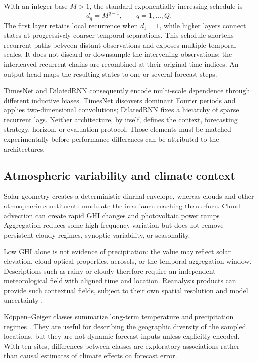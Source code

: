 With an integer base $M>1$, the standard exponentially increasing schedule is
\begin{equation}
  d_q=M^{q-1},\qquad q=1,\ldots,Q.
  \label{eq:dilation_schedule}
\end{equation}
The first layer retains local recurrence when $d_1=1$, while higher layers
connect states at progressively coarser temporal separations. This schedule
shortens recurrent paths between distant observations and exposes multiple
temporal scales. It does not discard or downsample the intervening
observations: the interleaved recurrent chains are recombined at their
original time indices. An output head maps the resulting states to one or
several forecast steps.

TimesNet and DilatedRNN consequently encode multi-scale dependence through
different inductive biases. TimesNet discovers dominant Fourier periods and
applies two-dimensional convolutions; DilatedRNN fixes a hierarchy of sparse
recurrent lags. Neither architecture, by itself, defines the context,
forecasting strategy, horizon, or evaluation protocol. Those elements must be
matched experimentally before performance differences can be attributed to
the architectures.

\subsection{Atmospheric variability and climate context}

Solar geometry creates a deterministic diurnal envelope, whereas clouds and
other atmospheric constituents modulate the irradiance reaching the surface.
Cloud advection can create rapid GHI changes and photovoltaic power ramps
\cite{chow2011,chen2020cloudramps}. Aggregation reduces some high-frequency
variation but does not remove persistent cloudy regimes, synoptic variability,
or seasonality.

Low GHI alone is not evidence of precipitation: the value may reflect solar
elevation, cloud optical properties, aerosols, or the temporal aggregation
window. Descriptions such as rainy or cloudy therefore require an independent
meteorological field with aligned time and location. Reanalysis products can
provide such contextual fields, subject to their own spatial resolution and
model uncertainty \cite{hersbach2020,copernicus2026era5}.

K{\"o}ppen--Geiger classes summarize long-term temperature and precipitation
regimes \cite{beck2018}. They are useful for describing the geographic
diversity of the sampled locations, but they are not dynamic forecast inputs
unless explicitly encoded. With ten sites, differences between classes are
exploratory associations rather than causal estimates of climate effects on
forecast error.
